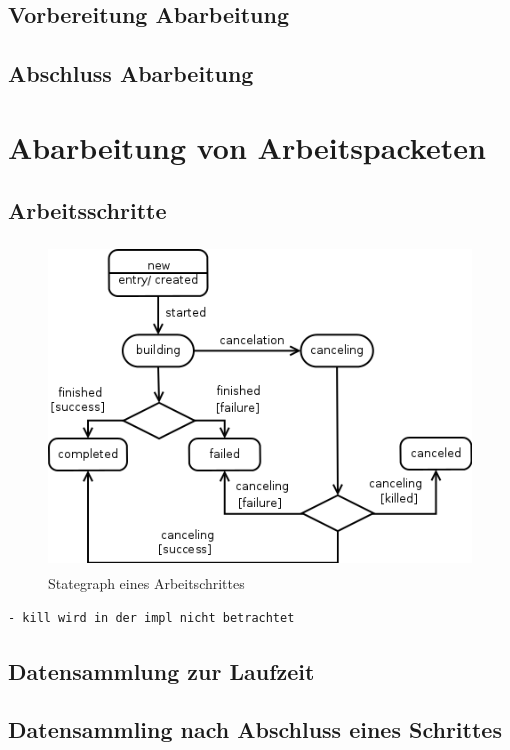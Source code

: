 \subsection{Vorbereitung Abarbeitung}
\subsection{Abschluss Abarbeitung}


\section{Abarbeitung von Arbeitspacketen}
\subsection{Arbeitsschritte}
\begin{figure}[ht] 
  \label{fig:lebenszyklus-arbeitsschritt}
  \begin{center}
      \includegraphics[height=3.4in]{imageinput/lebenszyklus-arbeitsschritt.png}
  \end{center}
  \caption{Stategraph eines Arbeitschrittes}
\end{figure}

\begin{verbatim}
- kill wird in der impl nicht betrachtet
\end{verbatim}


\subsection{Datensammlung zur Laufzeit}
\subsection{Datensammling nach Abschluss eines Schrittes}
